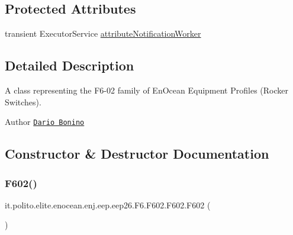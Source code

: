 \subsection*{Protected Attributes}
\begin{DoxyCompactItemize}
\item 
transient Executor\+Service \hyperlink{classit_1_1polito_1_1elite_1_1enocean_1_1enj_1_1eep_1_1eep26_1_1_f6_1_1_f602_1_1_f602_a7094f6e30512fed34569fdedc94b443b}{attribute\+Notification\+Worker}
\end{DoxyCompactItemize}


\subsection{Detailed Description}
A class representing the F6-\/02 family of En\+Ocean Equipment Profiles (Rocker Switches).

\begin{DoxyAuthor}{Author}
\href{mailto:dario.bonino@gmail.com}{\tt Dario Bonino} 
\end{DoxyAuthor}


\subsection{Constructor \& Destructor Documentation}
\hypertarget{classit_1_1polito_1_1elite_1_1enocean_1_1enj_1_1eep_1_1eep26_1_1_f6_1_1_f602_1_1_f602_aac0d7eaf0a480fc6ee52a23a2abfdd84}{}\label{classit_1_1polito_1_1elite_1_1enocean_1_1enj_1_1eep_1_1eep26_1_1_f6_1_1_f602_1_1_f602_aac0d7eaf0a480fc6ee52a23a2abfdd84} 
\subsubsection{\texorpdfstring{F602()}{F602()}}
{\footnotesize\ttfamily it.\+polito.\+elite.\+enocean.\+enj.\+eep.\+eep26.\+F6.\+F602.\+F602.\+F602 (\begin{DoxyParamCaption}{ }\end{DoxyParamCaption})}



